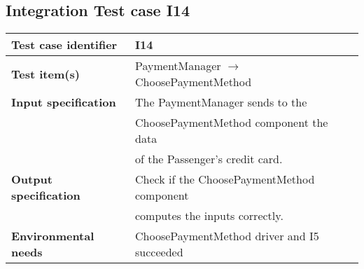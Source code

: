 	\hypertarget{chapter 3.14}{ }
	\subsection{Integration Test case I14}
		\begin{adjustbox}{max width=\textwidth}
			\begin{tabular}{ l l}
				\hline 		\textbf{Test case identifier} & I14 \\
				\hline		\textbf{Test item(s)}  & PaymentManager $\rightarrow$ ChoosePaymentMethod \\
				\hline		\textbf{Input specification} & The PaymentManager sends to the\\ &  ChoosePaymentMethod component the  data \\ & of the Passenger's credit card.\\
				\hline		\textbf{Output specification} & Check if the ChoosePaymentMethod component\\ &  computes the inputs correctly.\\
				\hline		\textbf{Environmental needs} & ChoosePaymentMethod driver and I5 succeeded\\
				\hline
			\end{tabular}
		\end{adjustbox}